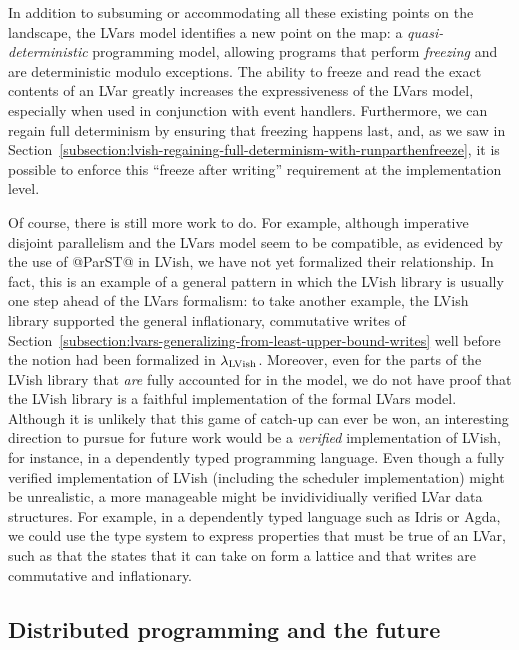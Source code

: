 In addition to subsuming or accommodating all these existing points on
the landscape, the LVars model identifies a new point on the map: a
\emph{quasi-deterministic} programming model, allowing programs that
perform \emph{freezing} and are deterministic modulo exceptions.  The
ability to freeze and read the exact contents of an LVar greatly
increases the expressiveness of the LVars model, especially when used
in conjunction with event handlers.  Furthermore, we can regain full
determinism by ensuring that freezing happens last, and, as we saw in
Section~\ref{subsection:lvish-regaining-full-determinism-with-runparthenfreeze},
it is possible to enforce this ``freeze after writing'' requirement at
the implementation level.

Of course, there is still more work to do.  For example, although
imperative disjoint parallelism and the LVars model seem to be
compatible, as evidenced by the use of @ParST@ in LVish, we have not
yet formalized their relationship.  In fact, this is an example of a
general pattern in which the LVish library is usually one step ahead
of the LVars formalism: to take another example, the LVish library
supported the general inflationary, commutative writes of
Section~\ref{subsection:lvars-generalizing-from-least-upper-bound-writes}
well before the notion had been formalized in $\lambda_{\textrm{LVish}}$.
Moreover, even for the parts of the LVish library that \emph{are}
fully accounted for in the model, we do not have proof that the LVish
library is a faithful implementation of the formal LVars model.
Although it is unlikely that this game of catch-up can ever be won, an
interesting direction to pursue for future work would be a
\emph{verified} implementation of LVish, for instance, in a
dependently typed programming language.  Even though a fully verified
implementation of LVish (including the scheduler implementation) might
be unrealistic, a more manageable might be invidividiually verified
LVar data structures.  For example, in a dependently typed language
such as Idris or Agda, we could use the type system to express
properties that must be true of an LVar, such as that the states that
it can take on form a lattice and that writes are commutative and
inflationary.

\subsection{Distributed programming and the future}


